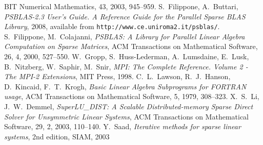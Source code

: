 \begin{thebibliography}{99}
BIT Numerical Mathematics, 43, 2003, 945--959.
%
S.~Filippone, A.~Buttari, 
{\em PSBLAS-2.3 User's Guide. A Reference Guide for the Parallel Sparse BLAS Library}, 2008,
available from \texttt{http://www.ce.uniroma2.it/psblas/}.
%
S.~Filippone, M.~Colajanni, 
{\em PSBLAS: A Library for Parallel Linear Algebra
Computation on Sparse Matrices},
ACM Transactions on Mathematical Software, 26, 4, 2000, 527--550.
%
W.~Gropp, S.~Huss-Lederman, A.~Lumsdaine, E.~Lusk, B.~Nitzberg, W.~Saphir, M.~Snir, 
{\em MPI: The Complete Reference. Volume 2 - The MPI-2 Extensions},
MIT Press, 1998.
%
C.~L.~Lawson, R.~J.~Hanson, D.~Kincaid, F.~T.~Krogh,
\emph{Basic Linear Algebra Subprograms for FORTRAN usage},
ACM Transactions on Mathematical Software, 5, 1979, 308--323.
%
X.~S.~Li, J.~W.~Demmel, {\em SuperLU\_DIST: A Scalable Distributed-memory
Sparse Direct Solver for Unsymmetric Linear Systems},
ACM Transactions on Mathematical Software, 29, 2, 2003, 110--140.
%
%
%
%
Y.~Saad,
\emph{Iterative methods for sparse linear systems}, 2nd edition,
SIAM, 2003


\end{thebibliography}
